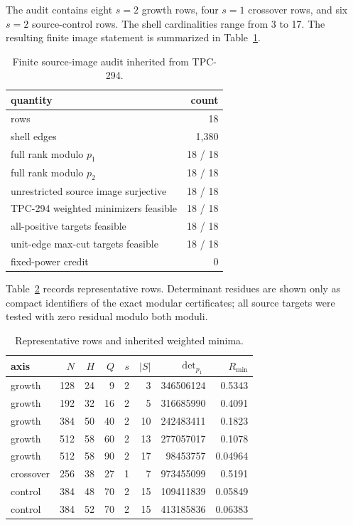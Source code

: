 \documentclass[10pt]{article}
\begin{document}
The audit contains eight $s=2$ growth rows, four $s=1$ crossover rows, and
six $s=2$ source-control rows.  The shell cardinalities range from 3 to 17.
The resulting finite image statement is summarized in
Table~\ref{tab:headline}.

\begin{table}[ht]
\centering
\small
\caption{Finite source-image audit inherited from TPC-294.}
\label{tab:headline}
\begin{tabular}{@{}lr@{}}
\toprule
quantity & count\\
\midrule
rows & 18\\
shell edges & 1,380\\
full rank modulo $p_1$ & 18 / 18\\
full rank modulo $p_2$ & 18 / 18\\
unrestricted source image surjective & 18 / 18\\
TPC-294 weighted minimizers feasible & 18 / 18\\
all-positive targets feasible & 18 / 18\\
unit-edge max-cut targets feasible & 18 / 18\\
fixed-power credit & 0\\
\bottomrule
\end{tabular}
\end{table}

Table~\ref{tab:rows} records representative rows.  Determinant residues
are shown only as compact identifiers of the exact modular certificates;
all source targets were tested with zero residual modulo both moduli.

\begin{table}[ht]
\centering
\scriptsize
\caption{Representative rows and inherited weighted minima.}
\label{tab:rows}
\begin{tabular}{@{}lrrrrrrr@{}}
\toprule
axis & $N$ & $H$ & $Q$ & $s$ & $|S|$ & $\det_{p_1}$ & $R_{\min}$\\
\midrule
growth &128&24&9 &2&3 &346506124&0.5343\\
growth &192&32&16&2&5 &316685990&0.4091\\
growth &384&50&40&2&10&242483411&0.1823\\
growth &512&58&60&2&13&277057017&0.1078\\
growth &512&58&90&2&17&98453757&0.04964\\
crossover&256&38&27&1&7 &973455099&0.5191\\
control &384&48&70&2&15&109411839&0.05849\\
control &384&52&70&2&15&413185836&0.06383\\
\bottomrule
\end{tabular}
\end{table}
\end{document}
